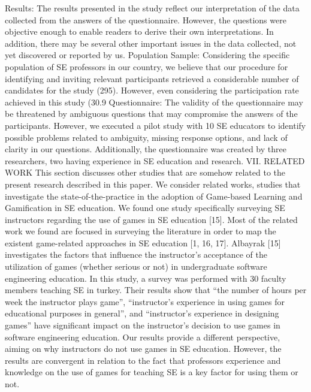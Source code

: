 Results: The results presented in the study reflect our interpretation of the data collected from the answers of the questionnaire. However, the questions were objective enough to enable readers to derive their own interpretations. In addition, there may be several other important issues in the data collected, not yet discovered or reported by us. 
Population Sample: Considering the specific population of SE professors in our country, we believe that our procedure for identifying and inviting relevant participants retrieved a considerable number of candidates for the study (295). However, even considering the participation rate achieved in this study (30.9%
Questionnaire: The validity of the questionnaire may be threatened by ambiguous questions that may compromise the answers of the participants. However, we executed a pilot study with 10 SE educators to identify possible problems related to ambiguity, missing response options, and lack of clarity in our questions. Additionally, the questionnaire was created by three researchers, two having experience in SE education and research. 
VII.	RELATED WORK
This section discusses other studies that are somehow related to the present research described in this paper. We consider related works, studies that investigate the state-of-the-practice in the adoption of Game-based Learning and Gamification in SE education. We found one study specifically surveying SE instructors regarding the use of games in SE education [15]. Most of the related work we found are focused in surveying the literature in order to map the existent game-related approaches in SE education [1, 16, 17].
Albayrak [15] investigates the factors that influence the instructor’s acceptance of the utilization of games (whether serious or not) in undergraduate software engineering education. In this study, a survey was performed with 30 faculty members teaching SE in turkey. Their results show that “the number of hours per week the instructor plays game”, “instructor’s experience in using games for educational purposes in general”, and “instructor’s experience in designing games” have significant impact on the instructor’s decision to use games in software engineering education. Our results provide a different perspective, aiming on why instructors do not use games in SE education. However, the results are convergent in relation to the fact that professors experience and knowledge on the use of games for teaching SE is a key factor for using them or not.
